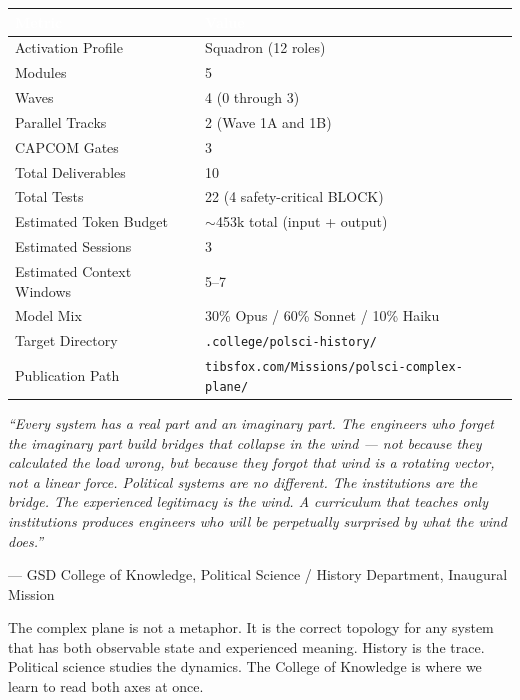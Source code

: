\documentclass[11pt,letterpaper]{article}
\newcommand{\tableheader}[1]{\textbf{\sffamily\textcolor{white}{#1}}}
\begin{document}
\begin{center}
\begin{tabularx}{\textwidth}{L{4cm}X}
\toprule
{}
\tableheader{Metric} & \tableheader{Value} \\
\midrule
Activation Profile & Squadron (12 roles) \\
Modules & 5 \\
Waves & 4 (0 through 3) \\
Parallel Tracks & 2 (Wave 1A and 1B) \\
CAPCOM Gates & 3 \\
Total Deliverables & 10 \\
Total Tests & 22 (4 safety-critical BLOCK) \\
Estimated Token Budget & $\sim$453k total (input + output) \\
Estimated Sessions & 3 \\
Estimated Context Windows & 5--7 \\
Model Mix & 30\% Opus / 60\% Sonnet / 10\% Haiku \\
Target Directory & \texttt{.college/polsci-history/} \\
Publication Path & \texttt{tibsfox.com/Missions/polsci-complex-plane/} \\
\bottomrule
\end{tabularx}
\end{center}

\vspace{2em}
\begin{quotebox}
\textit{``Every system has a real part and an imaginary part. The engineers who forget the imaginary part build bridges that collapse in the wind --- not because they calculated the load wrong, but because they forgot that wind is a rotating vector, not a linear force. Political systems are no different. The institutions are the bridge. The experienced legitimacy is the wind. A curriculum that teaches only institutions produces engineers who will be perpetually surprised by what the wind does.''}

\vspace{0.8em}
{\small\sffamily\textcolor{subtlegray}{--- GSD College of Knowledge, Political Science / History Department, Inaugural Mission}}

\vspace{0.5em}
{\small\sffamily The complex plane is not a metaphor. It is the correct topology for any system that has both observable state and experienced meaning. History is the trace. Political science studies the dynamics. The College of Knowledge is where we learn to read both axes at once.}
\end{quotebox}
\end{document}

